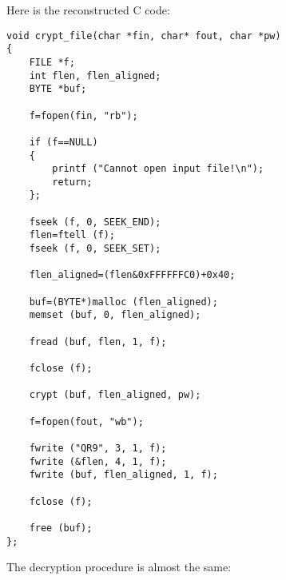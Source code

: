 Here is the reconstructed C code:

\begin{lstlisting}[style=customc]
void crypt_file(char *fin, char* fout, char *pw)
{
	FILE *f;
	int flen, flen_aligned;
	BYTE *buf;

	f=fopen(fin, "rb");
	
	if (f==NULL)
	{
		printf ("Cannot open input file!\n");
		return;
	};

	fseek (f, 0, SEEK_END);
	flen=ftell (f);
	fseek (f, 0, SEEK_SET);

	flen_aligned=(flen&0xFFFFFFC0)+0x40;

	buf=(BYTE*)malloc (flen_aligned);
	memset (buf, 0, flen_aligned);

	fread (buf, flen, 1, f);

	fclose (f);

	crypt (buf, flen_aligned, pw);
	
	f=fopen(fout, "wb");

	fwrite ("QR9", 3, 1, f);
	fwrite (&flen, 4, 1, f);
	fwrite (buf, flen_aligned, 1, f);

	fclose (f);

	free (buf);
};
\end{lstlisting}

The decryption procedure is almost the same:

